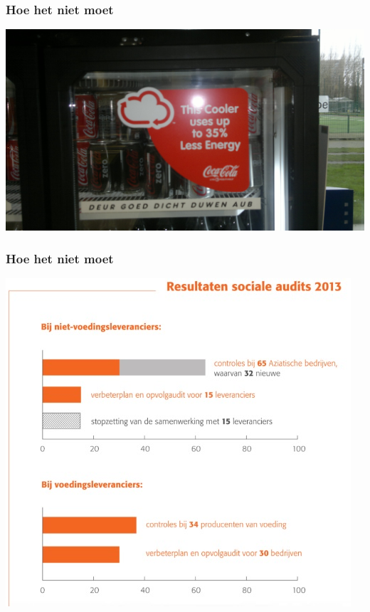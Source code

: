 \documentclass[aspectratio=169]{beamer}
\begin{document}
\begin{frame}
  \frametitle{Hoe het niet moet}

  \centering
  \includegraphics[height=.8\textheight]{img/intro-05.jpg}
\end{frame}

\begin{frame}
  \frametitle{Hoe het niet moet}

  \centering
  \includegraphics[height=.8\textheight]{img/intro-10.jpg}
\end{frame}
\end{document}
